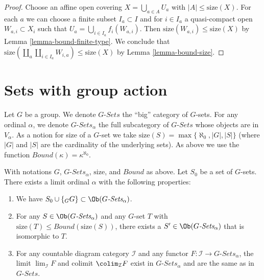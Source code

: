 \begin{proof}
Choose an affine open covering $X = \bigcup_{a \in A} U_a$ with
$|A| \leq \text{size}(X)$. For each $a$ we can choose
a finite subset $I_a \subset I$ and for $i \in I_a$ a quasi-compact open
$W_{a, i} \subset X_i$ such that $U_a = \bigcup_{i \in I_a} f_i(W_{a, i})$.
Then $\text{size}(W_{a, i}) \leq \text{size}(X)$ by
Lemma \ref{lemma-bound-finite-type}.
We conclude that
$\text{size}(\coprod_a \coprod_{i \in I_a} W_{i, a}) \leq \text{size}(X)$
by Lemma \ref{lemma-bound-size}.
\end{proof}





\section{Sets with group action}
\label{section-sets-with-group-action}

\noindent
Let $G$ be a group. We denote $G\textit{-Sets}$ the ``big'' category
of $G$-sets. For any ordinal $\alpha$, we denote
$G\textit{-Sets}_\alpha$ the full subcategory of $G\textit{-Sets}$
whose objects are in $V_\alpha$. As a notion for size of a $G$-set
we take $\text{size}(S) = \max\{\aleph_0, |G|, |S|\}$ (where $|G|$ and
$|S|$ are the cardinality of the underlying sets). As above we use the function
$Bound(\kappa) = \kappa^{\aleph_0}$.

\begin{lemma}
\label{lemma-sets-with-group-action}
With notations $G$, $G\textit{-Sets}_\alpha$, $\text{size}$,
and $Bound$ as above. Let $S_0$ be a set of $G$-sets.
There exists a limit ordinal $\alpha$ with the following properties:
\begin{enumerate}
\item We have $S_0 \cup \{{}_GG\} \subset \Ob(G\textit{-Sets}_\alpha)$.
\item For any $S \in \Ob(G\textit{-Sets}_\alpha)$ and any
$G$-set $T$ with $\text{size}(T) \leq Bound(\text{size}(S))$,
there exists a $S' \in \Ob(G\textit{-Sets}_\alpha)$
that is isomorphic to $T$.
\item For any countable diagram category $\mathcal{I}$ and
any functor $F : \mathcal{I} \to G\textit{-Sets}_\alpha$, the
limit $\lim_\mathcal{I} F$ and colimit
$\colim_\mathcal{I} F$ exist in $G\textit{-Sets}_\alpha$
and are the same as in $G\textit{-Sets}$.
\end{enumerate}
\end{lemma}

